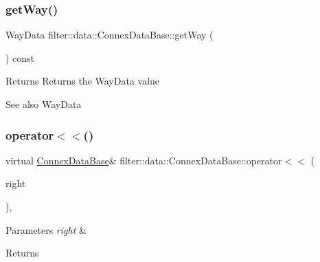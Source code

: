 \mbox{\label{classfilter_1_1data_1_1_connex_data_base_a1cfc155ebfbeb5f6a4538a52dafc2e42}} 
\subsubsection{\texorpdfstring{get\+Way()}{getWay()}}
{\footnotesize\ttfamily Way\+Data filter\+::data\+::\+Connex\+Data\+Base\+::get\+Way (\begin{DoxyParamCaption}{ }\end{DoxyParamCaption}) const\hspace{0.3cm}{\ttfamily [inline]}}

\begin{DoxyReturn}{Returns}
Returns the Way\+Data value 
\end{DoxyReturn}
\begin{DoxySeeAlso}{See also}
Way\+Data 
\end{DoxySeeAlso}
\mbox{\label{classfilter_1_1data_1_1_connex_data_base_a6d7080cbc59391a6c79ddc12442d6b62}} 
\subsubsection{\texorpdfstring{operator$<$$<$()}{operator<<()}}
{\footnotesize\ttfamily virtual \hyperlink{classfilter_1_1data_1_1_connex_data_base}{Connex\+Data\+Base}\& filter\+::data\+::\+Connex\+Data\+Base\+::operator$<$$<$ (\begin{DoxyParamCaption}\item[{\hyperlink{classfilter_1_1data_1_1_connex_data_base}{Connex\+Data\+Base} \&}]{right }\end{DoxyParamCaption})\hspace{0.3cm}{\ttfamily [inline]}, {\ttfamily [virtual]}}


\begin{DoxyParams}{Parameters}
{\em right} & \\
\hline
\end{DoxyParams}
\begin{DoxyReturn}{Returns}

\end{DoxyReturn}


